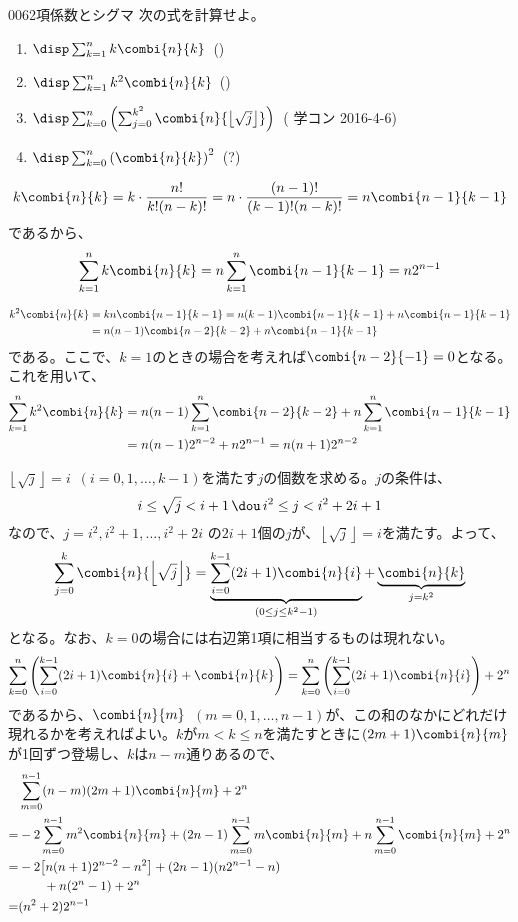 \begin{thm}{006}{}{2項係数とシグマ}
 次の式を計算せよ。
 \begin{enumerate}
  \item $\disp \sum_{k=1}^n k \combi{n}{k}$~()
  \item $\disp \sum_{k=1}^n k^2 \combi{n}{k}$~()
  \item $\disp \sum_{k=0}^n \left(\sum_{j=0}^{k^2} \combi{n}{\left\lfloor \sqrt{j} \right\rfloor}\right)$~( 学コン 2016-4-6)
  \item $\disp \sum_{k=0}^n \left(\combi{n}{k}\right)^2$~(\hosi ?)
 \end{enumerate}
\end{thm}

\[ k\combi{n}{k}=k\cdot\frac{n!}{k! (n-k)!}=n\cdot\frac{(n-1)!}{(k-1)!(n-k)!}=n\combi{n-1}{k-1} \]
であるから、
\[ \sum_{k=1}^n k\combi{n}{k}=n\sum_{k=1}^n \combi{n-1}{k-1}=n2^{n-1} \]

\begin{align*}
 k^2\combi{n}{k}&=kn\combi{n-1}{k-1}=n(k-1)\combi{n-1}{k-1}+n\combi{n-1}{k-1} \\
 &=n(n-1)\combi{n-2}{k-2}+n\combi{n-1}{k-1}
\end{align*}
である。ここで、$k=1$のときの場合を考えれば$\combi{n-2}{-1}=0$となる。これを用いて、
\begin{align*}
 \sum_{k=1}^n k^2\combi{n}{k}&=n(n-1)\sum_{k=1}^n\combi{n-2}{k-2}+n\sum_{k=1}^n\combi{n-1}{k-1} \\
 &=n(n-1)2^{n-2}+n2^{n-1}=n(n+1)2^{n-2}
\end{align*}

$\left\lfloor\sqrt{j}\right\rfloor=i$~$(i=0,1,\dots,k-1)$を満たす$j$の個数を求める。$j$の条件は、
\[ i\le \sqrt{j}< i+1 \,\dou\, i^2\le j<i^2+2i+1 \]
なので、$j=i^2, i^2+1,\dots , i^2+2i$ の$2i+1$個の$j$が、$\left\lfloor\sqrt{j}\right\rfloor=i$を満たす。よって、
\[ \sum_{j=0}^k\combi{n}{\left\lfloor\sqrt{j}\right\rfloor} = \underbrace{\sum_{i=0}^{k-1}(2i+1)\combi{n}{i}}_{(0\le j\le k^2-1)} + \underbrace{\combi{n}{k}}_{j=k^2} \]
となる。なお、$k=0$の場合には右辺第1項に相当するものは現れない。
\[ \sum_{k=0}^n\left(\sum_{i=0}^{k-1}(2i+1)\combi{n}{i} +\combi{n}{k}\right) = \sum_{k=0}^{n}\left(\sum_{i=0}^{k-1}(2i+1)\combi{n}{i}\right) + 2^n \]
であるから、$\combi{n}{m}$~$(m=0,1,\dots,n-1)$が、この和のなかにどれだけ現れるかを考えればよい。$k$が$m<k\le n$を満たすときに$(2m+1)\combi{n}{m}$が1回ずつ登場し、$k$は$n-m$通りあるので、
\begin{align*}
 &\sum_{m=0}^{n-1}(n-m)(2m+1)\combi{n}{m} +2^n \\
 =& -2\sum_{m=0}^{n-1}m^2\combi{n}{m}+(2n-1)\sum_{m=0}^{n-1}m\combi{n}{m}+n\sum_{m=0}^{n-1}\combi{n}{m} + 2^n \\
 =& -2\bigl[n(n+1)2^{n-2}-n^2\bigr]+(2n-1)(n2^{n-1}-n) \\
 & \qquad +n(2^n-1)+2^n \\
 =& (n^2+2)2^{n-1}
\end{align*}

